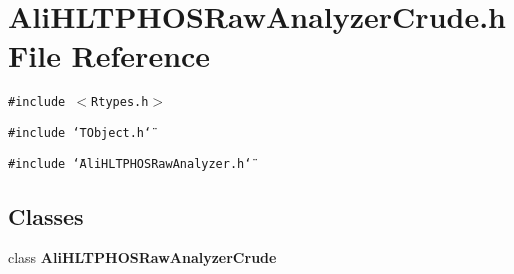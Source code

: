 \section{Ali\-HLTPHOSRaw\-Analyzer\-Crude.h File Reference}
\label{AliHLTPHOSRawAnalyzerCrude_8h}


{\tt \#include $<$Rtypes.h$>$}\par
{\tt \#include \char`\"{}TObject.h\char`\"{}}\par
{\tt \#include \char`\"{}Ali\-HLTPHOSRaw\-Analyzer.h\char`\"{}}\par
\subsection*{Classes}
\begin{CompactItemize}
\item 
class {\bf Ali\-HLTPHOSRaw\-Analyzer\-Crude}
\end{CompactItemize}
